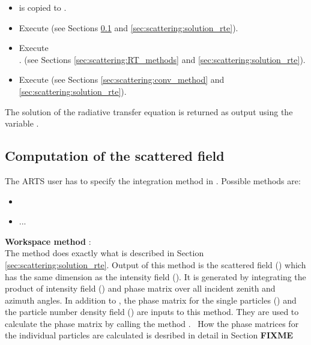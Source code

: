\begin{itemize}
\item {} is copied to .
\item Execute  (see Sections
  \ref{sec:scattering:sca_fieldCalc} and
  \ref{sec:scattering:solution_rte}).
\item Execute\\
  .  (see
  Sections \ref{sec:scattering:RT_methods} and
  \ref{sec:scattering:solution_rte}).
\item Execute  (see Sections
  \ref{sec:scattering:conv_method} and
  \ref{sec:scattering:solution_rte}).
\end{itemize}

The solution of the radiative transfer equation is returned as output
using the variable .


\subsection{Computation of the scattered field}
\label{sec:scattering:sca_fieldCalc}

The ARTS user has to specify the integration method in . Possible methods are:\\
\begin{itemize}
\item {}
\item ...
\end{itemize}

{\bf Workspace method }:\\
The method  does exactly what is described
in Section \ref{sec:scattering:solution_rte}.  Output of this method
is the scattered field () which has the same
dimension as the intensity field ().  It is
generated by integrating the product of intensity field
() and phase matrix  over all
incident zenith and azimuth angles.  In addition to
, the phase matrix for the single particles
() and the particle number density field
() are inputs to this method.  They are used to
calculate the phase matrix  by calling the method
.\ %
 How the phase matrices for the individual particles are calculated is desribed in detail in Section {\bf FIXME} %

